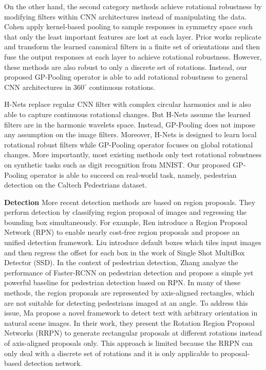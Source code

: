 \documentclass[10pt,twocolumn,letterpaper]{article}
\begin{document}
On the other hand, the second category methods achieve rotational robustness by modifying filters within CNN architectures instead of manipulating the data. Cohen \etal \cite{Cohen2016, Cohen2017} apply kernel-based pooling to sample responses in symmetry space such that only the least important features are lost at each layer. Prior works \cite{Marcos2016, Zhou, Marcos2016texture, And2015} replicate and transform the learned canonical filters in a finite set of orientations and then fuse the output responses at each layer to achieve rotational robustness. However, these methods are also robust to only a discrete set of rotations. Instead, our proposed GP-Pooling operator is able to add rotational robustness to general CNN architectures in $360^{\circ}$ continuous rotations.

H-Nets \cite{Worrall} replace regular CNN filter with complex circular harmonics and is also able to capture continuous rotational changes. But H-Nets assume the learned filters are in the harmonic wavelets space. Instead, GP-Pooling does not impose any assumption on the image filters. Moreover, H-Nets is designed to learn local rotational robust filters while GP-Pooling operator focuses on global rotational changes. More importantly, most existing methods only test rotational robustness on synthetic tasks such as digit recognition from MNIST. Our proposed GP-Pooling operator is able to succeed on real-world task, namely, pedestrian detection on the Caltech Pedestrians dataset.

\noindent\textbf{Detection} More recent detection methods are based on region proposals. They perform detection by classifying region proposal of images and regressing the bounding box simultaneously. For example, Ren \etal \cite{Ren2015} introduce a Region Proposal Network (RPN) to enable nearly cost-free region proposals and propose an unified detection framework. Liu \etal \cite{Liu2015} introduce default boxes which tiles input images and then regress the offset for each box in the work of Single Shot MultiBox Detector (SSD). In the context of pedestrian detection, Zhang \etal \cite{Zhang2016} analyze the performance of Faster-RCNN on pedestrian detection and propose a simple yet powerful baseline for pedestrian detection based on RPN. In many of these methods, the region proposals are represented by axis-aligned rectangles, which are not suitable for detecting pedestrians imaged at an angle. To address this issue, Ma \etal \cite{Ma2017} propose a novel framework to detect text with arbitrary orientation in natural scene images. In their work, they present the Rotation Region Proposal Networks (RRPN) to generate rectangular proposals at different rotations instead of axis-aligned proposals only. This approach is limited because the RRPN can only deal with a discrete set of rotations and it is only applicable to proposal-based detection network.
\end{document}
